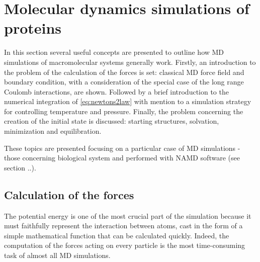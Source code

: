 \section{Molecular dynamics simulations of proteins}

In this section several useful concepts are presented to outline how MD simulations of macromolecular systems generally work. Firstly, an introduction to the problem of the calculation of the forces is set: classical MD force field and boundary condition, with a consideration of the special case of the long range Coulomb interactions, are shown. Followed by a brief introduction to the numerical integration of \eqref{eq:newtons2law} with mention to a simulation strategy for controlling temperature and pressure. Finally, the problem concerning the creation of the initial state is discussed: starting structures, solvation, minimization and equilibration.

These topics are presented focusing on a particular case of MD simulations - those concerning biological system and performed with NAMD software (see section ..). 


\subsection{Calculation of the forces}
The potential energy is one of the most crucial part of the simulation because it must faithfully represent the interaction between atoms, cast in the form of a simple mathematical function that can be calculated quickly. Indeed, the computation of the forces acting on every particle is the most time-consuming task of almost all MD simulations.

